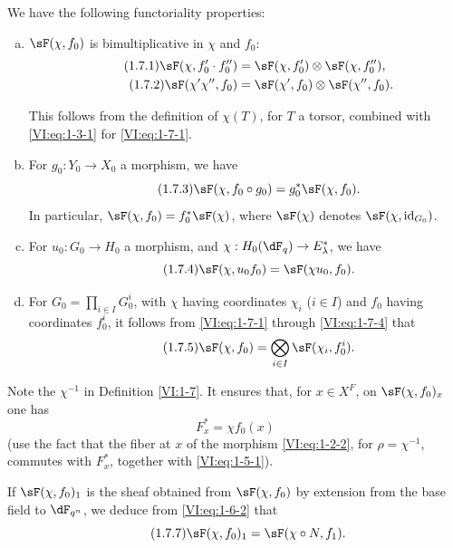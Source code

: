 \documentclass[oneside]{book}
\theoremstyle{sga-source}
\theoremstyle{sga-source-dash}
\theoremstyle{sga-source-dotdash}
\theoremstyle{sga-source-number-note-dash}
\theoremstyle{sga-source-note-number-dotdash}
\theoremstyle{sga-source-example-dotdash}
\theoremstyle{sga-source-inline-number}
\theoremstyle{sga-source-bare-number}
\theoremstyle{sga-source}
\newcommand{\PrintPage}[1]{}\newcommand{\MathPage}[1]{}\newcommand{\PrintCite}[2]{#1}\newcommand{\var}[3]{#1}
\begin{document}
We have the following functoriality properties:
\begin{enumerate}[a)]
  \item $\sF(\chi,f_0)$ is bimultiplicative in $\chi$ and $f_0$: 
    \begin{align*}\tag{1.7.1}\label{VI:eq:1-7-1}
      \sF(\chi,f_0'\cdot f_0'') &= \sF(\chi,f_0')\otimes \sF(\chi,f_0'') \text{,} \\
      \tag{1.7.2}\label{VI:eq:1-7-2}
      \sF(\chi'\chi'',f_0) &= \sF(\chi',f_0)\otimes \sF(\chi'',f_0) \text{.}
    \end{align*}
    \PrintPage{173}
This follows from the definition of $\chi(T)$, for $T$ a torsor, combined 
    with \eqref{VI:eq:1-3-1} for \eqref{VI:eq:1-7-1}. 
  \item For $g_0:Y_0\to X_0$ a morphism, we have 
    \begin{equation*}\tag{1.7.3}\label{VI:eq:1-7-3}
      \sF(\chi,f_0\circ g_0) = g_0^\ast \sF(\chi,f_0) \text{.}
    \end{equation*}
    In particular, $\sF(\chi,f_0) = f_0^\ast \sF(\chi)$, where $\sF(\chi)$ 
    denotes $\sF(\chi,\operatorname{id}_{G_0})$. 
  \item For $u_0:G_0\to H_0$ a morphism, and 
    $\chi:H_0(\dF_q) \to E_\lambda^\ast$, we have 
    \begin{equation*}\tag{1.7.4}\label{VI:eq:1-7-4}
      \sF(\chi,u_0 f_0) = \sF(\chi u_0,f_0) \text{.}
    \end{equation*}
  \item For $G_0=\prod_{i\in I} G_0^i$, with $\chi$ having coordinates $\chi_i$ 
    ($i\in I$) and $f_0$ having coordinates $f_0^i$, it follows from 
    \eqref{VI:eq:1-7-1} through \eqref{VI:eq:1-7-4} that 
    \begin{equation*}\tag{1.7.5}\label{VI:eq:1-7-5}
      \sF(\chi,f_0) = \bigotimes_{i\in I} \sF(\chi_i,f_0^i) \text{.}
    \end{equation*}    
\end{enumerate}

Note the $\chi^{-1}$ in Definition \ref{VI:1-7}. It ensures that, for 
$x\in X^F$, on $\sF(\chi,f_0)_x$ one has 
\begin{equation*}\tag{1.7.6}\label{VI:eq:1-7-6}
  F_x^\ast = \chi f_0(x)
\end{equation*}
(use the fact that the fiber at $x$ of the morphism \eqref{VI:eq:1-2-2}, for 
$\rho=\chi^{-1}$, commutes with $F_x^\ast$, together with \eqref{VI:eq:1-5-1}). 

If $\sF(\chi,f_0)_1$ is the sheaf obtained from $\sF(\chi,f_0)$ by extension 
from the base field to $\dF_{q^n}$, we deduce from \eqref{VI:eq:1-6-2} that 
\begin{equation*}\tag{1.7.7}\label{VI:eq:1-7-7}
  \sF(\chi,f_0)_1 = \sF(\chi\circ N,f_1) \text{.}
\end{equation*}
\end{document}
